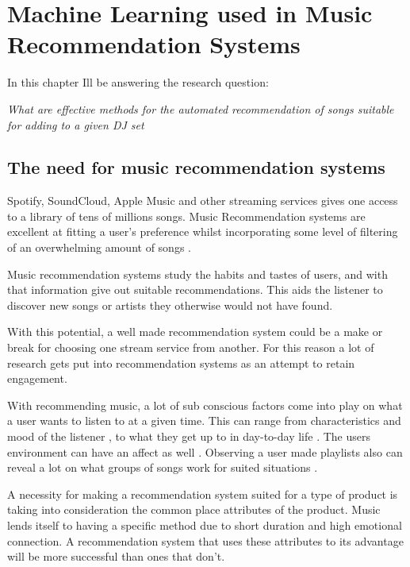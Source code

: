 
\graphicspath{{Chapter2/}}

\chapter{Machine Learning used in Music Recommendation Systems}

In this chapter Ill be answering the research question:

\textit{What are effective methods for the automated recommendation of songs suitable for adding to a given DJ set} 

\section{The need for music recommendation systems}
Spotify, SoundCloud, Apple Music and other streaming services gives one access to a library of tens of millions songs. Music Recommendation systems are excellent at fitting a user's preference whilst incorporating some level of filtering of an overwhelming amount of songs \citep{bollen_understanding_2010}. 

Music recommendation systems study the habits and tastes of users, and with that information give out suitable recommendations. This aids the listener to discover new songs or artists they otherwise would not have found.

With this potential, a well made recommendation system could be a make or break for choosing one stream service from another. For this reason a lot of research gets put into recommendation systems as an attempt to retain engagement. 

 With recommending music, a lot of sub conscious factors come into play on what a user wants to listen to at a given time. This can range from characteristics and mood of the listener \citep{ferwerda_personality_2015}  \citep{rentfrow_re_2003}, to what they get up to in day-to-day life \citep{gillhofer_iron_2015} \citep{wang_context-aware_2012}.  The users environment can have an affect as well \citep{kaminskas_location-aware_2013}. Observing a user made playlists also can reveal a lot on what groups of songs work for suited situations \citep{zheleva_statistical_2010} \citep{mcfee_hypergraph_2012}.
 
 A necessity for making a recommendation system suited for a type of product is taking into consideration the common place attributes of the product. Music lends itself to having a specific method due to short duration and high emotional connection. A recommendation system that uses these attributes to its advantage will be more successful than ones that don't.

